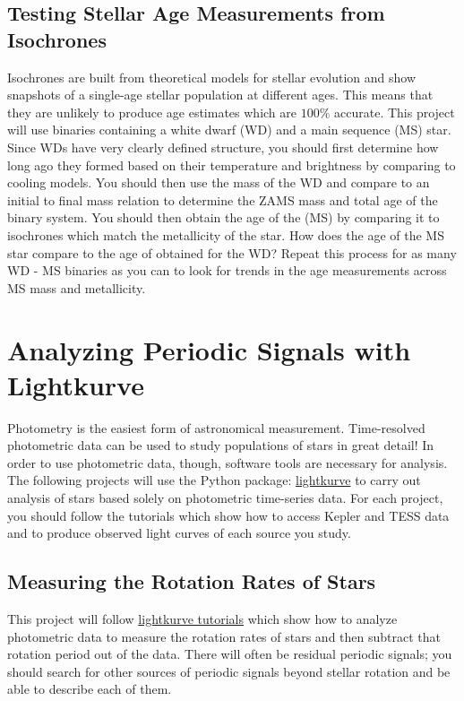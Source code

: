 \documentclass[10pt]{extarticle}
\begin{document}
\subsection{Testing Stellar Age Measurements from Isochrones}
Isochrones are built from theoretical models for stellar evolution and show
snapshots of a single-age stellar population at different ages. This means that
they are unlikely to produce age estimates which are $100\%$ accurate. This
project will use binaries containing a white dwarf (WD) and a main sequence (MS)
star. Since WDs have very clearly defined structure, you should first determine
how long ago they formed based on their temperature and brightness by comparing
to cooling models. You should then use the mass of the WD and compare to an
initial to final mass relation to determine the ZAMS mass and total age of the
binary system. You should then obtain the age of the (MS) by comparing it to
isochrones which match the metallicity of the star. How does the age of the MS
star compare to the age of obtained for the WD? Repeat this process for as many
WD - MS binaries as you can to look for trends in the age measurements across MS
mass and metallicity. 

\section{Analyzing Periodic Signals with Lightkurve}
Photometry is the easiest form of astronomical measurement. Time-resolved
photometric data can be used to study populations of stars in great detail! In
order to use photometric data, though, software tools are necessary for
analysis. The following projects will use the Python package:
\href{https://docs.lightkurve.org/index.html}{lightkurve} to carry out analysis
of stars based solely on photometric time-series data. For each project, you
should follow the tutorials which show how to access Kepler and TESS data and to
produce observed light curves of each source you study. 

\subsection{Measuring the Rotation Rates of Stars}
This project will follow
\href{https://docs.lightkurve.org/tutorials/index.html#rotation-rates-and-periodic-signals}{lightkurve
tutorials} which show how to analyze photometric data to measure the rotation
rates of stars and then subtract that rotation period out of the data. There
will often be residual periodic signals; you should search for other sources of
periodic signals beyond stellar rotation and be able to describe each of them. 
\end{document}

